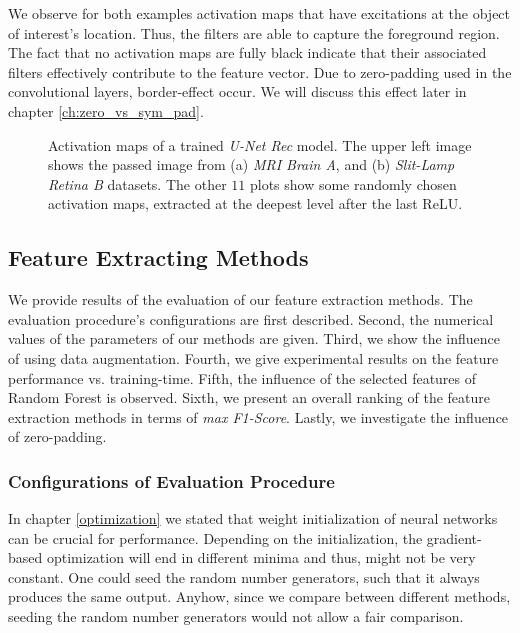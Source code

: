 We observe for both examples activation maps that have excitations at the object of interest's location. Thus, the filters are able to capture the foreground region. The fact that no activation maps are fully black indicate that their associated filters effectively contribute to the feature vector. Due to zero-padding used in the convolutional layers, border-effect occur. We will discuss this effect later in chapter \ref{ch:zero_vs_sym_pad}.
\vspace{30pt}

\begin{figure}[!htbp]
  \centering
  \hfill
  \caption[Activation maps]{Activation maps of a trained \textit{U-Net Rec} model. The upper left image shows the passed image from (a) \textit{MRI Brain A}, and (b) \textit{Slit-Lamp Retina B} datasets. The other $11$ plots show some randomly chosen activation maps, extracted at the deepest level after the last ReLU.}
  \label{fig:activatiom_maps}
\end{figure}

\clearpage
\subsection{Feature Extracting Methods}
We provide results of the evaluation of our feature extraction methods. The evaluation procedure's configurations are first described. Second, the numerical values of the parameters of our methods are given. Third, we show the influence of using data augmentation. Fourth, we give experimental results on the feature performance vs. training-time. Fifth, the influence of the selected features of Random Forest is observed. Sixth, we present an overall ranking of the feature extraction methods in terms of \textit{max F1-Score}. Lastly, we investigate the influence of zero-padding.

\subsubsection{Configurations of Evaluation Procedure} \label{ch:eval_configs}
In chapter \ref{optimization} we stated that weight initialization of neural networks can be crucial for performance. Depending on the initialization, the gradient-based optimization will end in different minima and thus, might not be very constant. One could seed the random number generators, such that it always produces the same output. Anyhow, since we compare between different methods, seeding the random number generators would not allow a fair comparison.

